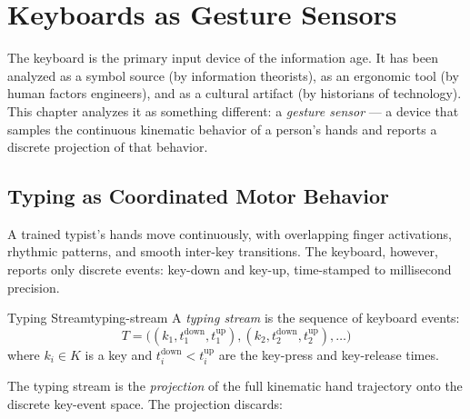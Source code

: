 
\chapter{Keyboards as Gesture Sensors}



The keyboard is the primary input device of the information age. It has
been analyzed as a symbol source (by information theorists), as an
ergonomic tool (by human factors engineers), and as a cultural artifact
(by historians of technology). This chapter analyzes it as something
different: a \emph{gesture sensor} — a device that samples the continuous
kinematic behavior of a person's hands and reports a discrete projection
of that behavior.

\section{Typing as Coordinated Motor Behavior}

A trained typist's hands move continuously, with overlapping finger
activations, rhythmic patterns, and smooth inter-key transitions.
The keyboard, however, reports only discrete events: key-down and key-up,
time-stamped to millisecond precision.

\begin{definition}{Typing Stream}{typing-stream}
  A \emph{typing stream} is the sequence of keyboard events:
  \[
    T = \bigl((k_1, t_1^\text{down}, t_1^\text{up}),
               (k_2, t_2^\text{down}, t_2^\text{up}), \ldots\bigr)
  \]
  where $k_i \in K$ is a key and $t_i^\text{down} < t_i^\text{up}$
  are the key-press and key-release times.
\end{definition}

The typing stream is the \emph{projection} of the full kinematic
hand trajectory onto the discrete key-event space. The projection
discards:

